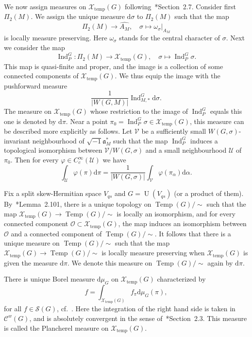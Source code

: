 \documentclass[letterpaper,11pt]{amsart}
\newcommand{\fa}{\mathfrak{a}}
\newcommand{\cC}{\mathcal{C}}
\newcommand{\cO}{\mathcal{O}}
\newcommand{\cS}{\mathcal{S}}
\newcommand{\cU}{\mathcal{U}}
\newcommand{\cV}{\mathcal{V}}
\newcommand{\cX}{\mathcal{X}}
\newcommand{\rd}{\mathrm{d}}
\newcommand{\<}{\negthickspace}
\providecommand{\abs}[1]{\lvert#1\rvert}
\DeclareMathOperator{\U}{U}
\DeclareMathOperator{\Ind}{Ind}
\DeclareMathOperator{\Temp}{Temp} \DeclareMathOperator{\temp}{temp}
\theoremstyle{definition}
\theoremstyle{plain}
\theoremstyle{remark}
\numberwithin{equation}{section}
\begin{document}
We now assign measures on $\cX_{\temp}(G)$
following~\cite{BP1}*{Section~2.7}. Consider first $\Pi_2(M)$. We assign the
unique measure $\rd \sigma$ to $\Pi_2(M)$ such that the map
    \[
    \Pi_2(M) \to \widehat{A_M}, \quad \sigma \mapsto \omega_{\sigma}|_{A_M}
    \]
is locally measure preserving. Here $\omega_{\sigma}$ stands for the central
character of $\sigma$. Next we consider the map
    \[
    \Ind_P^G: \Pi_2(M) \to \cX_{\temp}(G), \quad \sigma \mapsto \Ind_P^G \sigma.
    \]
This map is quasi-finite and proper, and the image is a collection of some
connected components of $\cX_{\temp}(G)$. We thus equip the image with the
pushforward measure
    \[
    \frac{1}{\abs{W(G, M)}} \Ind_{M, *}^G \rd \sigma.
    \]
The measure on $\cX_{\temp}(G)$ whose restriction to the image of $\Ind_P^G$
equals this one is denoted by $\rd \pi$. Near a point $\pi_0 = \Ind_{P}^G
\sigma \in \cX_{\temp}(G)$, this measure can be described more explicitly as
follows. Let $\cV$ be a sufficiently small $W(G, \sigma)$-invariant
neighbourhood of $\sqrt{-1}\fa_M^*$ such that the map $\Ind_P^G$ induces a
topological isomorphism between $\cV/W(G, \sigma)$ and a small neighbourhood
$\cU$ of $\pi_0$. Then for every $\varphi \in C_c^\infty(\cU)$ we have
    \[
    \int_{\cU} \varphi(\pi) \rd \pi = \frac{1}{\abs{W(G, \sigma)}}
    \int_{\cV} \varphi(\pi_{\alpha}) \rd \alpha.
    \]


Fix a split skew-Hermitian space $V_{qs}$ and $G = \U(V_{qs})$ (or a
product of them). By~\cite{BP1}*{Lemma~2.101}, there is a unique topology on
$\Temp(G)/\sim$ such that the map $\cX_{\temp}(G) \to \Temp(G)/\sim$ is
locally an isomorphism, and for every connected component $\cO \subset
\cX_{\temp}(G)$, the map induces an isomorphism between $\cO$ and a connected
component of $\Temp(G)/\sim$. It follows that there is a unique measure on
$\Temp(G)/\sim$ such that the map $\cX_{\temp}(G) \to \Temp(G)/\sim$ is
locally measure preserving when $\cX_{\temp}(G)$ is given the measure $\rd
\pi$. We denote this measure on $\Temp(G)/\sim$ again by $\rd \pi$.




There is unique Borel measure $\rd \mu_G$ on $\cX_{\temp}(G)$ characterized by
    \begin{equation}    \label{eq:plancherel_general}
    f = \int_{\cX_{\temp}(G)} f_{\pi} \rd \mu_G(\pi),
    \end{equation}
for all $f \in \cS(G)$, cf.~\cites{HC,Wald}. Here the integration of the right hand side is taken
in $\cC^w(G)$, and is absolutely convergent in the sense
of~\cite{BP1}*{Section~2.3}. This measure is called the Plancherel measure on $\cX_{\temp}(G)$.
\end{document}
